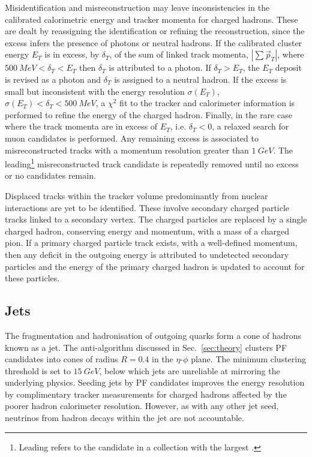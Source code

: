 Misidentification and misreconstruction may leave inconsistencies in the
calibrated calorimetric energy and tracker momenta for charged hadrons. These
are dealt by reassigning the identification or refining the reconstruction,
since the excess infers the presence of photons or neutral hadrons. If the
calibrated cluster energy $E_T$ is in excess, by $\delta_T$, of the sum of
linked track momenta, $|\sum \vec{p}_T|$, where ${\SI{500}{MeV}<\delta_T<E_T}$
then $\delta_T$ is attributed to a photon. If $\delta_T>E_T$, the $E_T$
deposit is revised as a photon and $\delta_T$ is assigned to a neutral hadron.
If the excess is small but inconsistent with the energy resolution
$\sigma(E_T)$, ${\sigma(E_T)<\delta_T<\SI{500}{MeV}}$, a $\chi^2$ fit to the
tracker and calorimeter information is performed to refine the energy of the
charged hadron. Finally, in the rare case where the track momenta are in
excess of $E_T$, i.e. $\delta_T<0$, a relaxed search for muon candidates is
performed. Any remaining excess is associated to misreconstructed tracks with
a momentum resolution greater than ${\SI{1}{GeV}}$. The leading\footnote{Leading refers to the candidate in a collection with the largest \pt.} misreconstructed track candidate is repeatedly removed until no excess or no
candidates remain.

Displaced tracks within the tracker volume predominantly from nuclear
interactions are yet to be identified. These involve secondary
charged particle tracks linked to a secondary vertex. The charged particles
are replaced by a single charged hadron, conserving energy and momentum, with
a mass of a charged pion. If a primary charged particle track exists, with a
well-defined momentum, then any deficit in the outgoing energy is attributed
to undetected secondary particles and the energy of the primary charged
hadron is updated to account for these particles.


\subsection{Jets}

The fragmentation and hadronisation of outgoing quarks form a cone of hadrons
known as a jet. The anti-\kt algorithm \cite{Cacciari:2008gp,Cacciari2012}
discussed in Sec.~\ref{sec:theory} clusters PF candidates into cones of
radius $R=0.4$ in the $\eta$-$\phi$ plane.  The minimum clustering threshold
is set to $\SI{15}{GeV}$, below which jets are unreliable at mirroring the
underlying physics. Seeding jets by PF candidates improves the energy
resolution by complimentary tracker measurements for charged hadrons affected
by the poorer hadron calorimeter resolution. However, as with any other jet
seed, neutrinos from hadron decays within  the jet are not accountable.


